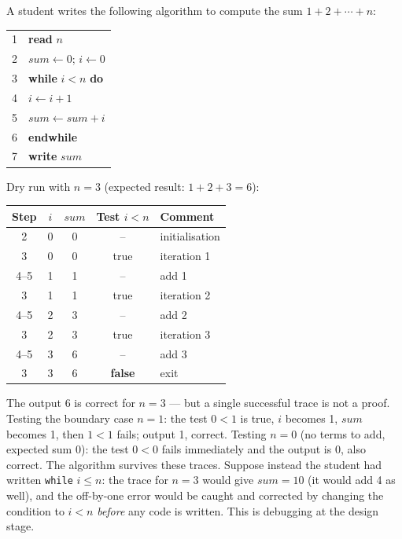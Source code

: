 \documentclass[11pt]{article}
\begin{document}
\begin{exemplebox}
A student writes the following algorithm to compute the sum $1 + 2 + \cdots + n$:

\begin{center}
\begin{tabular}{ll}
1 & \textbf{read} $n$ \\
2 & $sum \leftarrow 0$; $i \leftarrow 0$ \\
3 & \textbf{while} $i < n$ \textbf{do} \\
4 & \qquad $i \leftarrow i + 1$ \\
5 & \qquad $sum \leftarrow sum + i$ \\
6 & \textbf{endwhile} \\
7 & \textbf{write} $sum$ \\
\end{tabular}
\end{center}

Dry run with $n = 3$ (expected result: $1 + 2 + 3 = 6$):

\begin{center}
\begin{tabular}{|c|c|c|c|l|}
\hline
\rowcolor{popblueL} Step & $i$ & $sum$ & Test $i < n$ & Comment \\
\hline
2 & 0 & 0 & -- & initialisation \\
\hline
3 & 0 & 0 & true & iteration 1 \\
\hline
4--5 & 1 & 1 & -- & add 1 \\
\hline
3 & 1 & 1 & true & iteration 2 \\
\hline
4--5 & 2 & 3 & -- & add 2 \\
\hline
3 & 2 & 3 & true & iteration 3 \\
\hline
4--5 & 3 & 6 & -- & add 3 \\
\hline
3 & 3 & 6 & \textbf{false} & exit \\
\hline
\end{tabular}
\end{center}

The output 6 is correct for $n = 3$ --- but a single successful trace is not a proof. Testing the boundary case $n = 1$: the test $0 < 1$ is true, $i$ becomes 1, $sum$ becomes 1, then $1 < 1$ fails; output 1, correct. Testing $n = 0$ (no terms to add, expected sum 0): the test $0 < 0$ fails immediately and the output is 0, also correct. The algorithm survives these traces. Suppose instead the student had written \texttt{while} $i \leq n$: the trace for $n = 3$ would give $sum = 10$ (it would add 4 as well), and the off-by-one error would be caught and corrected by changing the condition to $i < n$ \emph{before} any code is written. This is debugging at the design stage.
\end{exemplebox}
\end{document}

